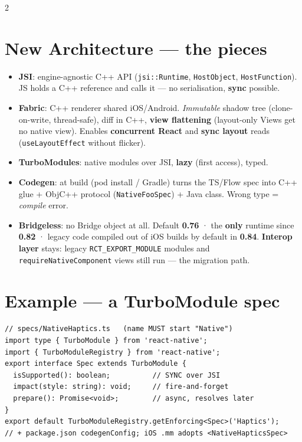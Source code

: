 \documentclass[8pt]{extarticle}
\begin{document}
\begin{multicols}{2}
\section{New Architecture — the pieces}
\begin{itemize}
  \item \textbf{JSI}: engine-agnostic C++ API (\texttt{jsi::Runtime}, \texttt{HostObject},
        \texttt{HostFunction}). JS holds a C++ reference and calls it — no
        serialisation, \textbf{sync} possible.
  \item \textbf{Fabric}: C++ renderer shared iOS/Android. \emph{Immutable} shadow tree
        (clone-on-write, thread-safe), diff in C++, \textbf{view flattening} (layout-only
        Views get no native view). Enables \textbf{concurrent React} and
        \textbf{sync layout} reads (\texttt{useLayoutEffect} without flicker).
  \item \textbf{TurboModules}: native modules over JSI, \textbf{lazy} (first access), typed.
  \item \textbf{Codegen}: at build (pod install / Gradle) turns the TS/Flow spec into C++
        glue + ObjC++ protocol (\texttt{NativeFooSpec}) + Java class. Wrong type =
        \emph{compile} error.
  \item \textbf{Bridgeless}: no Bridge object at all. Default \textbf{0.76} · the
        \textbf{only} runtime since \textbf{0.82} · legacy code compiled out of iOS builds
        by default in \textbf{0.84}. \textbf{Interop layer} stays: legacy
        \texttt{RCT\_EXPORT\_MODULE} modules and \texttt{requireNativeComponent} views
        still run — the migration path.
\end{itemize}

\section{Example — a TurboModule spec}
\begin{lstlisting}[language=TSSheet]
// specs/NativeHaptics.ts   (name MUST start "Native")
import type { TurboModule } from 'react-native';
import { TurboModuleRegistry } from 'react-native';
export interface Spec extends TurboModule {
  isSupported(): boolean;          // SYNC over JSI
  impact(style: string): void;     // fire-and-forget
  prepare(): Promise<void>;        // async, resolves later
}
export default TurboModuleRegistry.getEnforcing<Spec>('Haptics');
// + package.json codegenConfig; iOS .mm adopts <NativeHapticsSpec>
\end{lstlisting}


\end{multicols}
\end{document}
